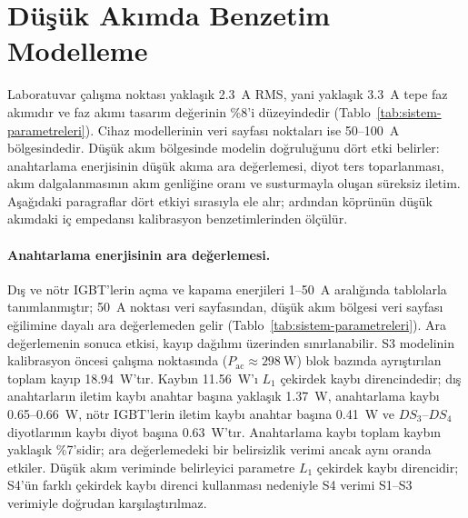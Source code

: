 \section{Düşük Akımda Benzetim Modelleme}
\label{sec:dusuk-akim-modelleme}

Laboratuvar çalışma noktası yaklaşık \SI{2.3}{\ampere} RMS, yani yaklaşık \SI{3.3}{\ampere} tepe faz akımıdır ve faz akımı tasarım değerinin \%8'i düzeyindedir (Tablo~\ref{tab:sistem-parametreleri}). Cihaz modellerinin veri sayfası noktaları ise \num{50}--\SI{100}{\ampere} bölgesindedir. Düşük akım bölgesinde modelin doğruluğunu dört etki belirler: anahtarlama enerjisinin düşük akıma ara değerlemesi, diyot ters toparlanması, akım dalgalanmasının akım genliğine oranı ve susturmayla oluşan süreksiz iletim. Aşağıdaki paragraflar dört etkiyi sırasıyla ele alır; ardından köprünün düşük akımdaki iç empedansı kalibrasyon benzetimlerinden ölçülür.

\paragraph{Anahtarlama enerjisinin ara değerlemesi.} Dış ve nötr IGBT'lerin açma ve kapama enerjileri \num{1}--\SI{50}{\ampere} aralığında tablolarla tanımlanmıştır; \SI{50}{\ampere} noktası veri sayfasından, düşük akım bölgesi veri sayfası eğilimine dayalı ara değerlemeden gelir (Tablo~\ref{tab:sistem-parametreleri}). Ara değerlemenin sonuca etkisi, kayıp dağılımı üzerinden sınırlanabilir. S3 modelinin kalibrasyon öncesi çalışma noktasında ($P_{\mathrm{ac}}\approx\SI{298}{\watt}$) blok bazında ayrıştırılan toplam kayıp \SI{18.94}{\watt}'tır. Kaybın \SI{11.56}{\watt}'ı $L_1$ çekirdek kaybı direncindedir; dış anahtarların iletim kaybı anahtar başına yaklaşık \SI{1.37}{\watt}, anahtarlama kaybı \num{0.65}--\SI{0.66}{\watt}, nötr IGBT'lerin iletim kaybı anahtar başına \SI{0.41}{\watt} ve $DS_3$--$DS_4$ diyotlarının kaybı diyot başına \SI{0.63}{\watt}'tır. Anahtarlama kaybı toplam kaybın yaklaşık \%7'sidir; ara değerlemedeki bir belirsizlik verimi ancak aynı oranda etkiler. Düşük akım veriminde belirleyici parametre $L_1$ çekirdek kaybı direncidir; S4'ün farklı çekirdek kaybı direnci kullanması nedeniyle S4 verimi S1--S3 verimiyle doğrudan karşılaştırılmaz.

